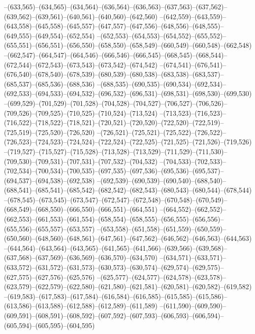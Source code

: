 --(633,565)--(634,565)--(634,564)--(636,564)--(636,563)--(637,563)--(637,562)--(639,562)--(639,561)--(640,561)--(640,560)--(642,560)
--(642,559)--(643,559)--(643,558)--(645,558)--(645,557)--(647,557)--(647,556)--(648,556)--(648,555)--(649,555)--(649,554)--(652,554)
--(652,553)--(654,553)--(654,552)--(655,552)--(655,551)--(656,551)--(656,550)--(658,550)--(658,549)--(660,549)--(660,548)--(662,548)
--(662,547)--(664,547)--(664,546)--(666,546)--(666,545)--(668,545)--(668,544)--(672,544)--(672,543)--(673,543)--(673,542)--(674,542)
--(674,541)--(676,541)--(676,540)--(678,540)--(678,539)--(680,539)--(680,538)--(683,538)--(683,537)--(685,537)--(685,536)--(688,536)
--(688,535)--(690,535)--(690,534)--(692,534)--(692,533)--(694,533)--(694,532)--(696,532)--(696,531)--(698,531)--(698,530)--(699,530)
--(699,529)--(701,529)--(701,528)--(704,528)--(704,527)--(706,527)--(706,526)--(709,526)--(709,525)--(710,525)--(710,524)--(713,524)
--(713,523)--(716,523)--(716,522)--(718,522)--(718,521)--(720,521)--(720,520)--(722,520)--(722,519)--(725,519)--(725,520)--(726,520)
--(726,521)--(725,521)--(725,522)--(726,522)--(726,523)--(724,523)--(724,524)--(722,524)--(722,525)--(721,525)--(721,526)--(719,526)
--(719,527)--(715,527)--(715,528)--(713,528)--(713,529)--(711,529)--(711,530)--(709,530)--(709,531)--(707,531)--(707,532)--(704,532)
--(704,533)--(702,533)--(702,534)--(700,534)--(700,535)--(697,535)--(697,536)--(695,536)--(695,537)--(694,537)--(694,538)--(692,538)
--(692,539)--(690,539)--(690,540)--(688,540)--(688,541)--(685,541)--(685,542)--(682,542)--(682,543)--(680,543)--(680,544)--(678,544)
--(678,545)--(673,545)--(673,547)--(672,547)--(672,548)--(670,548)--(670,549)--(668,549)--(668,550)--(666,550)--(666,551)--(664,551)
--(664,552)--(662,552)--(662,553)--(661,553)--(661,554)--(658,554)--(658,555)--(656,555)--(656,556)--(655,556)--(655,557)--(653,557)
--(653,558)--(651,558)--(651,559)--(650,559)--(650,560)--(648,560)--(648,561)--(647,561)--(647,562)--(646,562)--(646,563)--(644,563)
--(644,564)--(643,564)--(643,565)--(641,565)--(641,566)--(639,566)--(639,568)--(637,568)--(637,569)--(636,569)--(636,570)--(634,570)
--(634,571)--(633,571)--(633,572)--(631,572)--(631,573)--(630,573)--(630,574)--(629,574)--(629,575)--(627,575)--(627,576)--(625,576)
--(625,577)--(624,577)--(624,578)--(623,578)--(623,579)--(622,579)--(622,580)--(621,580)--(621,581)--(620,581)--(620,582)--(619,582)
--(619,583)--(617,583)--(617,584)--(616,584)--(616,585)--(615,585)--(615,586)--(613,586)--(613,588)--(612,588)--(612,589)--(611,589)
--(611,590)--(609,590)--(609,591)--(608,591)--(608,592)--(607,592)--(607,593)--(606,593)--(606,594)--(605,594)--(605,595)--(604,595)
